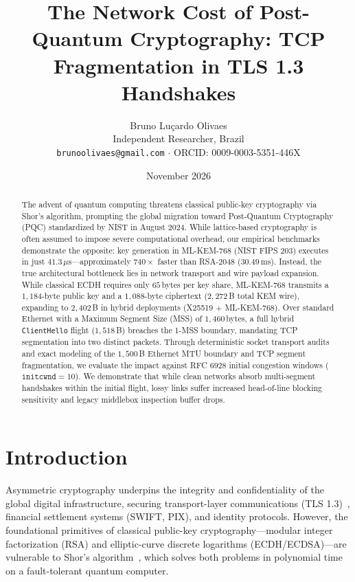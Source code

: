 \documentclass[10pt,twocolumn,a4paper]{article}
\title{\textbf{The Network Cost of Post-Quantum Cryptography: TCP Fragmentation in TLS 1.3 Handshakes}}
\author{Bruno Lu\c{c}ardo Olivaes \\ \small Independent Researcher, Brazil \\ \small \texttt{brunoolivaes@gmail.com} $\cdot$ ORCID: 0009-0003-5351-446X}
\date{November 2026}
\begin{document}
\maketitle

\begin{abstract}
\noindent The advent of quantum computing threatens classical public-key cryptography via Shor's algorithm, prompting the global migration toward Post-Quantum Cryptography (PQC) standardized by NIST in August 2024. While lattice-based cryptography is often assumed to impose severe computational overhead, our empirical benchmarks demonstrate the opposite: key generation in ML-KEM-768 (NIST FIPS 203) executes in just $41.3\,\mu\mathrm{s}$—approximately $740\times$ faster than RSA-2048 ($30.49\,$ms). Instead, the true architectural bottleneck lies in network transport and wire payload expansion. While classical ECDH requires only $65\,$bytes per key share, ML-KEM-768 transmits a $1{,}184$-byte public key and a $1{,}088$-byte ciphertext ($2{,}272\,$B total KEM wire), expanding to $2{,}402\,$B in hybrid deployments (X25519 + ML-KEM-768). Over standard Ethernet with a Maximum Segment Size (MSS) of $1{,}460\,$bytes, a full hybrid \texttt{ClientHello} flight ($1{,}518\,$B) breaches the 1-MSS boundary, mandating TCP segmentation into two distinct packets. Through deterministic socket transport audits and exact modeling of the $1{,}500\,$B Ethernet MTU boundary and TCP segment fragmentation, we evaluate the impact against RFC 6928 initial congestion windows ($\texttt{initcwnd} = 10$). We demonstrate that while clean networks absorb multi-segment handshakes within the initial flight, lossy links suffer increased head-of-line blocking sensitivity and legacy middlebox inspection buffer drops.
\end{abstract}

\section{Introduction}
Asymmetric cryptography underpins the integrity and confidentiality of the global digital infrastructure, securing transport-layer communications (TLS 1.3)~\cite{rescorla2018}, financial settlement systems (SWIFT, PIX), and identity protocols. However, the foundational primitives of classical public-key cryptography—modular integer factorization (RSA) and elliptic-curve discrete logarithms (ECDH/ECDSA)—are vulnerable to Shor's algorithm~\cite{shor1994}, which solves both problems in polynomial time on a fault-tolerant quantum computer.
\end{document}

